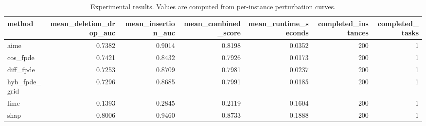 \begin{table}[t]
\caption{Experimental results. Values are computed from per-instance perturbation curves.}
\label{tab:main_results_computed}
\centering
\begin{tabular}{lrrrrrr}
\toprule
method & mean\_deletion\_drop\_auc & mean\_insertion\_auc & mean\_combined\_score & mean\_runtime\_seconds & completed\_instances & completed\_tasks \\
\midrule
aime & 0.7382 & 0.9014 & 0.8198 & 0.0352 & 200 & 1 \\
cos\_fpde & 0.7421 & 0.8432 & 0.7926 & 0.0173 & 200 & 1 \\
diff\_fpde & 0.7253 & 0.8709 & 0.7981 & 0.0237 & 200 & 1 \\
hyb\_fpde\_grid & 0.7296 & 0.8685 & 0.7991 & 0.0185 & 200 & 1 \\
lime & 0.1393 & 0.2845 & 0.2119 & 0.1604 & 200 & 1 \\
shap & 0.8006 & 0.9460 & 0.8733 & 0.1888 & 200 & 1 \\
\bottomrule
\end{tabular}

\end{table}
